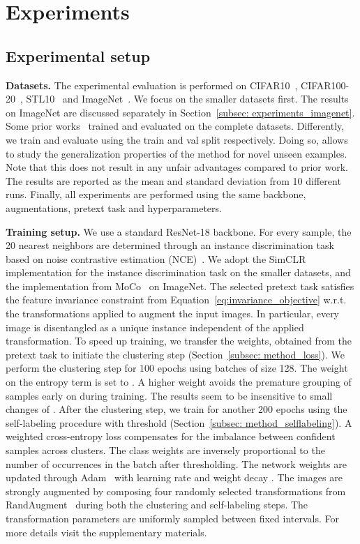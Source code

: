 \documentclass[runningheads]{llncs}
\begin{document}
 \section{Experiments}
\label{sec:experiments}

\subsection{Experimental setup}
\label{subsec: experiments_datasets}
\noindent\textbf{Datasets.}
The experimental evaluation is performed on CIFAR10~\cite{CIFAR}, CIFAR100-20~\cite{CIFAR}, STL10~\cite{STL} and ImageNet~\cite{ImageNet}. We focus on the smaller datasets first. The results on ImageNet are discussed separately in Section~\ref{subsec: experiments_imagenet}. Some prior works~\cite{IIC,DAC,DEC,yang2016joint} trained and evaluated on the complete datasets. Differently, we train and evaluate using the train and val split respectively. Doing so, allows to study the generalization properties of the method for novel unseen examples. Note that this does not result in any unfair advantages compared to prior work. The results are reported as the mean and standard deviation from 10 different runs. Finally, all experiments are performed using the same backbone, augmentations, pretext task and hyperparameters.

\noindent\textbf{Training setup.}
We use a standard ResNet-18 backbone. For every sample, the 20 nearest neighbors are determined through an instance discrimination task based on noise contrastive estimation (NCE)~\cite{wu2018unsupervised}. We adopt the SimCLR~\cite{chen2020simple} implementation for the instance discrimination task on the smaller datasets, and the implementation from MoCo~\cite{chen2020improved} on ImageNet. The selected pretext task satisfies the feature invariance constraint from Equation~\ref{eq:invariance_objective} w.r.t. the transformations applied to augment the input images. In particular, every image is disentangled as a unique instance independent of the applied transformation. To speed up training, we transfer the weights, obtained from the pretext task to initiate the clustering step (Section~\ref{subsec: method_loss}). We perform the clustering step for 100 epochs using batches of size 128. The weight on the entropy term is set to . A higher weight avoids the premature grouping of samples early on during training. The results seem to be insensitive to small changes of . After the clustering step, we train for another 200 epochs using the self-labeling procedure with threshold  (Section~\ref{subsec: method_selflabeling}). A weighted cross-entropy loss compensates for the imbalance between confident samples across clusters. The class weights are inversely proportional to the number of occurrences in the batch after thresholding. The network weights are updated through Adam~\cite{kingma2014adam} with learning rate  and weight decay . The images are strongly augmented by composing four randomly selected transformations from RandAugment~\cite{cubuk2020randaugment} during both the clustering and self-labeling steps. The transformation parameters are uniformly sampled between fixed intervals. For more details visit the supplementary materials. 
\end{document}
